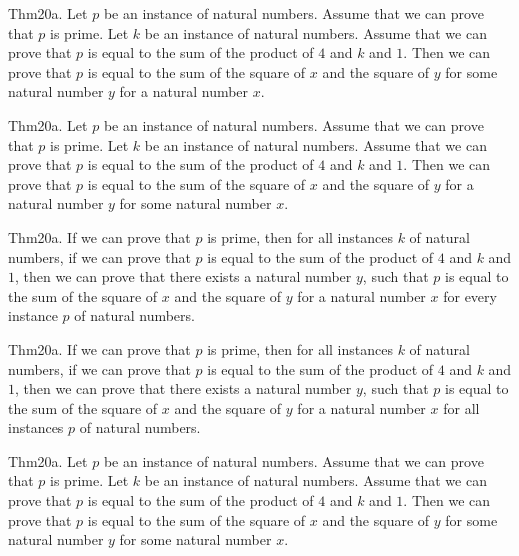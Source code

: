 \documentclass{article}
\begin{document}
Thm20a. Let $p$ be an instance of natural numbers. Assume that we can prove that $p$ is prime. Let $k$ be an instance of natural numbers. Assume that we can prove that $p$ is equal to the sum of the product of $4$ and $k$ and $1$. Then we can prove that $p$ is equal to the sum of the square of $x$ and the square of $y$ for some natural number $y$ for a natural number $x$.

Thm20a. Let $p$ be an instance of natural numbers. Assume that we can prove that $p$ is prime. Let $k$ be an instance of natural numbers. Assume that we can prove that $p$ is equal to the sum of the product of $4$ and $k$ and $1$. Then we can prove that $p$ is equal to the sum of the square of $x$ and the square of $y$ for a natural number $y$ for some natural number $x$.

Thm20a. If we can prove that $p$ is prime, then for all instances $k$ of natural numbers, if we can prove that $p$ is equal to the sum of the product of $4$ and $k$ and $1$, then we can prove that there exists a natural number $y$, such that $p$ is equal to the sum of the square of $x$ and the square of $y$ for a natural number $x$ for every instance $p$ of natural numbers.

Thm20a. If we can prove that $p$ is prime, then for all instances $k$ of natural numbers, if we can prove that $p$ is equal to the sum of the product of $4$ and $k$ and $1$, then we can prove that there exists a natural number $y$, such that $p$ is equal to the sum of the square of $x$ and the square of $y$ for a natural number $x$ for all instances $p$ of natural numbers.

Thm20a. Let $p$ be an instance of natural numbers. Assume that we can prove that $p$ is prime. Let $k$ be an instance of natural numbers. Assume that we can prove that $p$ is equal to the sum of the product of $4$ and $k$ and $1$. Then we can prove that $p$ is equal to the sum of the square of $x$ and the square of $y$ for some natural number $y$ for some natural number $x$.
\end{document}
